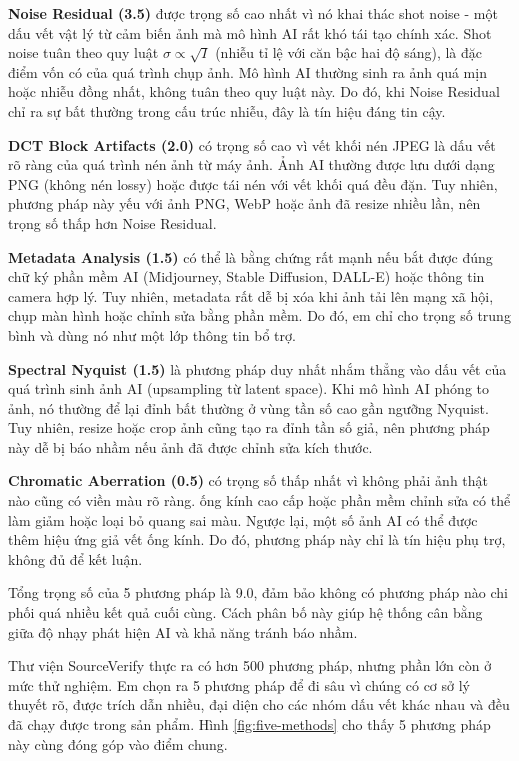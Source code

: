 \documentclass[14pt,a4paper,oneside]{report}
\begin{document}
\textbf{Noise Residual (3.5)} được trọng số cao nhất vì nó khai thác shot noise - một dấu vết vật lý từ cảm biến ảnh mà mô hình AI rất khó tái tạo chính xác. Shot noise tuân theo quy luật $\sigma\propto\sqrt{I}$ (nhiễu tỉ lệ với căn bậc hai độ sáng), là đặc điểm vốn có của quá trình chụp ảnh. Mô hình AI thường sinh ra ảnh quá mịn hoặc nhiễu đồng nhất, không tuân theo quy luật này. Do đó, khi Noise Residual chỉ ra sự bất thường trong cấu trúc nhiễu, đây là tín hiệu đáng tin cậy.

\textbf{DCT Block Artifacts (2.0)} có trọng số cao vì vết khối nén JPEG là dấu vết rõ ràng của quá trình nén ảnh từ máy ảnh. Ảnh AI thường được lưu dưới dạng PNG (không nén lossy) hoặc được tái nén với vết khối quá đều đặn. Tuy nhiên, phương pháp này yếu với ảnh PNG, WebP hoặc ảnh đã resize nhiều lần, nên trọng số thấp hơn Noise Residual.

\textbf{Metadata Analysis (1.5)} có thể là bằng chứng rất mạnh nếu bắt được đúng chữ ký phần mềm AI (Midjourney, Stable Diffusion, DALL-E) hoặc thông tin camera hợp lý. Tuy nhiên, metadata rất dễ bị xóa khi ảnh tải lên mạng xã hội, chụp màn hình hoặc chỉnh sửa bằng phần mềm. Do đó, em chỉ cho trọng số trung bình và dùng nó như một lớp thông tin bổ trợ.

\textbf{Spectral Nyquist (1.5)} là phương pháp duy nhất nhắm thẳng vào dấu vết của quá trình sinh ảnh AI (upsampling từ latent space). Khi mô hình AI phóng to ảnh, nó thường để lại đỉnh bất thường ở vùng tần số cao gần ngưỡng Nyquist. Tuy nhiên, resize hoặc crop ảnh cũng tạo ra đỉnh tần số giả, nên phương pháp này dễ bị báo nhầm nếu ảnh đã được chỉnh sửa kích thước.

\textbf{Chromatic Aberration (0.5)} có trọng số thấp nhất vì không phải ảnh thật nào cũng có viền màu rõ ràng. ống kính cao cấp hoặc phần mềm chỉnh sửa có thể làm giảm hoặc loại bỏ quang sai màu. Ngược lại, một số ảnh AI có thể được thêm hiệu ứng giả vết ống kính. Do đó, phương pháp này chỉ là tín hiệu phụ trợ, không đủ để kết luận.

Tổng trọng số của 5 phương pháp là 9.0, đảm bảo không có phương pháp nào chi phối quá nhiều kết quả cuối cùng. Cách phân bố này giúp hệ thống cân bằng giữa độ nhạy phát hiện AI và khả năng tránh báo nhầm.

Thư viện SourceVerify thực ra có hơn 500 phương pháp, nhưng phần lớn còn ở mức thử nghiệm. Em chọn ra 5 phương pháp để đi sâu vì chúng có cơ sở lý thuyết rõ, được trích dẫn nhiều, đại diện cho các nhóm dấu vết khác nhau và đều đã chạy được trong sản phẩm. Hình \ref{fig:five-methods} cho thấy 5 phương pháp này cùng đóng góp vào điểm chung.
\end{document}
